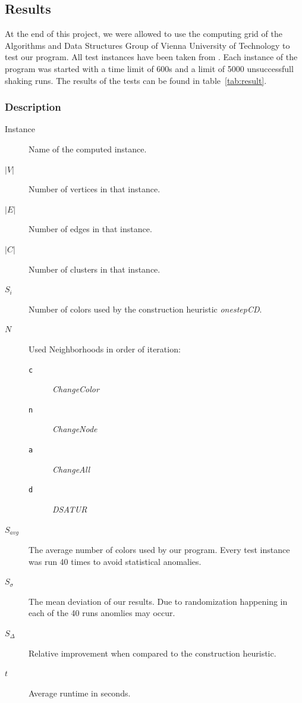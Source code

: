 \documentclass[paper=a4,fontsize=12pt]{scrartcl}
\begin{document}
\subsection{Results}

At the end of this project, we were allowed to use the computing grid of the Algorithms and Data Structures Group of Vienna University of Technology to test our program. All test instances have been taken from \cite{Noronha2006}. Each instance of the program was started with a time limit of 600s and a limit of 5000 unsuccessfull shaking runs. The results of the tests can be found in table~\ref{tab:result}.





\subsubsection*{Description}

\begin{description}
    \item[Instance] Name of the computed instance.
    \item[$|V|$] Number of vertices in that instance.
    \item[$|E|$] Number of edges in that instance.
    \item[$|C|$] Number of clusters in that instance.
    \item[$S_i$] Number of colors used by the construction heuristic \emph{onestepCD}.
    \item[$N$] Used Neighborhoods in order of iteration:
        \begin{description}
            \item[\texttt{c}] \emph{ChangeColor}
            \item[\texttt{n}] \emph{ChangeNode}
            \item[\texttt{a}] \emph{ChangeAll}
            \item[\texttt{d}] \emph{DSATUR}
        \end{description}
    \item[$S_{avg}$] The average number of colors used by our program. Every test instance was run 40 times to avoid statistical anomalies.
    \item[$S_{\sigma}$] The mean deviation of our results. Due to randomization happening in each of the 40 runs anomlies may occur.
    \item[$S_{\Delta}$] Relative improvement when compared to the construction heuristic.
    \item[$t$] Average runtime in seconds.
\end{description}
\end{document}
